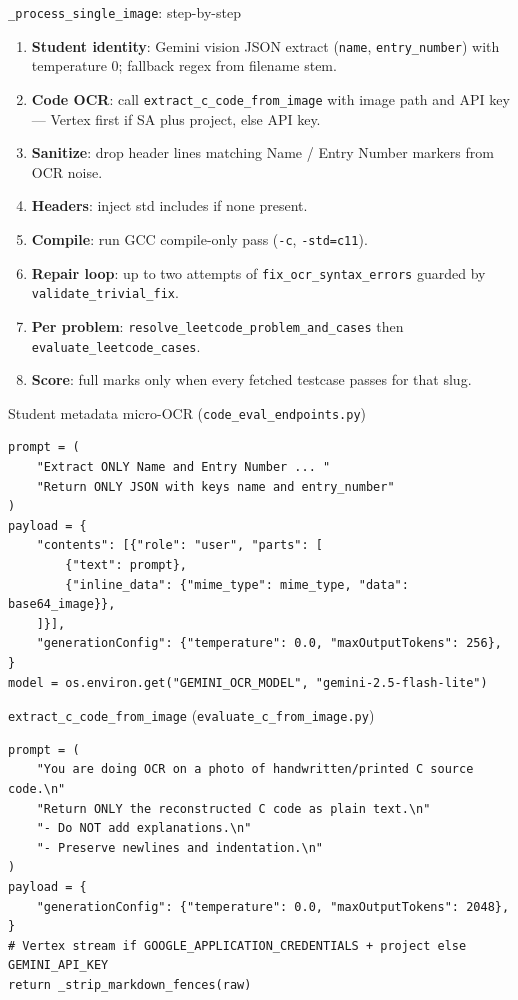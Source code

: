 \documentclass[aspectratio=169]{beamer}
\begin{document}
\begin{frame}{\texttt{\_process\_single\_image}: step-by-step}
  \footnotesize
  \begin{enumerate}
    \item \textbf{Student identity}: Gemini vision JSON extract (\texttt{name}, \texttt{entry\_number}) with temperature 0; fallback regex from filename stem.
    \item \textbf{Code OCR}: call \texttt{extract\_c\_code\_from\_image} with image path and API key --- Vertex first if SA plus project, else API key.
    \item \textbf{Sanitize}: drop header lines matching Name / Entry Number markers from OCR noise.
    \item \textbf{Headers}: inject std includes if none present.
    \item \textbf{Compile}: run GCC compile-only pass (\texttt{-c}, \texttt{-std=c11}).
    \item \textbf{Repair loop}: up to two attempts of \texttt{fix\_ocr\_syntax\_errors} guarded by \texttt{validate\_trivial\_fix}.
    \item \textbf{Per problem}: \texttt{resolve\_leetcode\_problem\_and\_cases} then \texttt{evaluate\_leetcode\_cases}.
    \item \textbf{Score}: full marks only when every fetched testcase passes for that slug.
  \end{enumerate}
\end{frame}

\begin{frame}[fragile]{Student metadata micro-OCR (\texttt{code\_eval\_endpoints.py})}
\begin{lstlisting}[style=py]
prompt = (
    "Extract ONLY Name and Entry Number ... "
    "Return ONLY JSON with keys name and entry_number"
)
payload = {
    "contents": [{"role": "user", "parts": [
        {"text": prompt},
        {"inline_data": {"mime_type": mime_type, "data": base64_image}},
    ]}],
    "generationConfig": {"temperature": 0.0, "maxOutputTokens": 256},
}
model = os.environ.get("GEMINI_OCR_MODEL", "gemini-2.5-flash-lite")
\end{lstlisting}
\end{frame}

\begin{frame}[fragile]{\texttt{extract\_c\_code\_from\_image} (\texttt{evaluate\_c\_from\_image.py})}
\begin{lstlisting}[style=py]
prompt = (
    "You are doing OCR on a photo of handwritten/printed C source code.\n"
    "Return ONLY the reconstructed C code as plain text.\n"
    "- Do NOT add explanations.\n"
    "- Preserve newlines and indentation.\n"
)
payload = {
    "generationConfig": {"temperature": 0.0, "maxOutputTokens": 2048},
}
# Vertex stream if GOOGLE_APPLICATION_CREDENTIALS + project else GEMINI_API_KEY
return _strip_markdown_fences(raw)
\end{lstlisting}
\end{frame}
\end{document}
